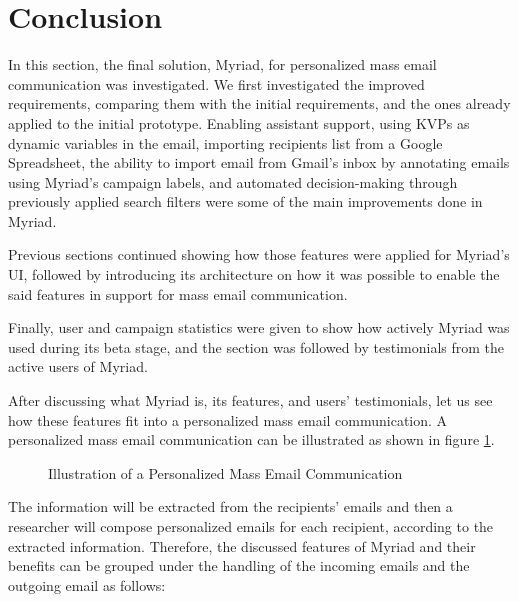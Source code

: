 \section{Conclusion}
\label{sec:5.5:Conc}

In this section, the final solution, Myriad, for personalized mass email communication was investigated. We first investigated the improved requirements, comparing them with the initial requirements, and the ones already applied to the initial prototype. Enabling assistant support, using \ac{KVP}s as dynamic variables in the email, importing recipients list from a Google Spreadsheet, the ability to import email from Gmail's inbox by annotating emails using Myriad's campaign labels, and automated decision-making through previously applied search filters were some of the main improvements done in Myriad.
\vspace{1cm}

Previous sections continued showing how those features were applied for Myriad's \ac{UI}, followed by introducing its architecture on how it was possible to enable the said features in support for mass email communication.
\vspace{1cm}

Finally, user and campaign statistics were given to show how actively Myriad was used during its beta stage, and the section was followed by testimonials from the active users of Myriad.
\vspace{1cm}

After discussing what Myriad is, its features, and users' testimonials, let us see how these features fit into a personalized mass email communication. A personalized mass email communication can be illustrated as shown in figure \ref{fig:drawingStatesOfEmailCommunication}.
\vspace{1cm}

\begin{figure}[htbp]
	\centering
	\begin{pdfpic}
	    
	\end{pdfpic}
	\caption[Illustration of a Personalized Mass Email Communication]{Illustration of a Personalized Mass Email Communication}
	\label{fig:drawingStatesOfEmailCommunication}
\end{figure}

The information will be extracted from the recipients' emails and then a researcher will compose personalized emails for each recipient, according to the extracted information. Therefore, the discussed features of Myriad and their benefits can be grouped under the handling of the incoming emails and the outgoing email as follows:

